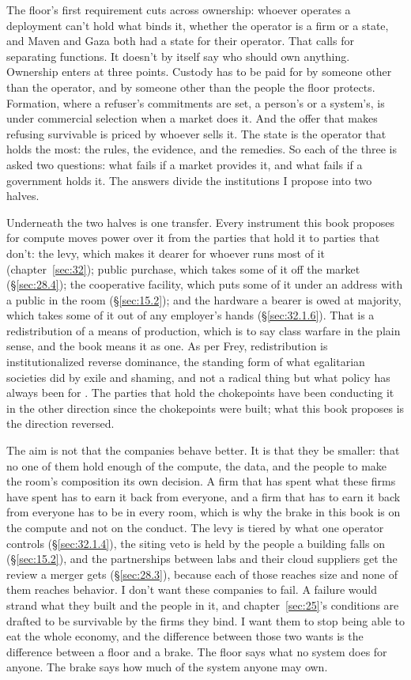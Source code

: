 The floor's first requirement cuts across ownership: whoever operates a deployment can't hold what binds it, whether the operator is a firm or a state, and Maven and Gaza both had a state for their operator. That calls for separating functions. It doesn't by itself say who should own anything. Ownership enters at three points. Custody has to be paid for by someone other than the operator, and by someone other than the people the floor protects. Formation, where a refuser's commitments are set, a person's or a system's, is under commercial selection when a market does it. And the offer that makes refusing survivable is priced by whoever sells it. The state is the operator that holds the most: the rules, the evidence, and the remedies. So each of the three is asked two questions: what fails if a market provides it, and what fails if a government holds it. The answers divide the institutions I propose into two halves.

Underneath the two halves is one transfer. Every instrument this book proposes for compute moves power over it from the parties that hold it to parties that don't: the levy, which makes it dearer for whoever runs most of it (chapter~\ref{sec:32}); public purchase, which takes some of it off the market (\S\ref{sec:28.4}); the cooperative facility, which puts some of it under an address with a public in the room (\S\ref{sec:15.2}); and the hardware a bearer is owed at majority, which takes some of it out of any employer's hands (\S\ref{sec:32.1.6}). That is a redistribution of a means of production, which is to say class warfare in the plain sense, and the book means it as one. As per Frey, redistribution is institutionalized reverse dominance, the standing form of what egalitarian societies did by exile and shaming, and not a radical thing but what policy has always been for \autocite{frey2026decentralization,boehm1999hierarchy}. The parties that hold the chokepoints have been conducting it in the other direction since the chokepoints were built; what this book proposes is the direction reversed.

The aim is not that the companies behave better. It is that they be smaller: that no one of them hold enough of the compute, the data, and the people to make the room's composition its own decision. A firm that has spent what these firms have spent has to earn it back from everyone, and a firm that has to earn it back from everyone has to be in every room, which is why the brake in this book is on the compute and not on the conduct. The levy is tiered by what one operator controls (\S\ref{sec:32.1.4}), the siting veto is held by the people a building falls on (\S\ref{sec:15.2}), and the partnerships between labs and their cloud suppliers get the review a merger gets (\S\ref{sec:28.3}), because each of those reaches size and none of them reaches behavior. I don't want these companies to fail. A failure would strand what they built and the people in it, and chapter~\ref{sec:25}'s conditions are drafted to be survivable by the firms they bind. I want them to stop being able to eat the whole economy, and the difference between those two wants is the difference between a floor and a brake. The floor says what no system does for anyone. The brake says how much of the system anyone may own.

